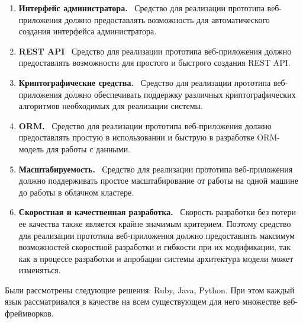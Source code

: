 \begin{enumerate}
  \item \textbf{Интерфейс администратора.}\hfill ~\linebreak
        Средство для реализации прототипа веб-приложения должно предоставлять возможность для автоматического создания интерфейса администратора.

  \item \textbf{REST API}\hfill ~\linebreak
        Средство для реализации прототипа веб-приложения должно предоставлять возможности для простого и быстрого создания REST API.

  \item \textbf{Криптографические средства.}\hfill ~\linebreak
        Средство для реализации прототипа веб-приложения должно обеспечивать поддержку различных криптографических алгоритмов необходимых для реализации системы.

  \item \textbf{ORM.}\hfill ~\linebreak
        Средство для реализации прототипа веб-приложения должно предоставлять простую в использовании и быструю в разработке ORM-модель для работы с данными.

  \item \textbf{Масштабируемость.}\hfill ~\linebreak
        Средство для реализации прототипа веб-приложения должно поддерживать простое масштабирование от работы на одной машине до работы в облачном кластере.

  \item \textbf{Скоростная и качественная разработка.}\hfill ~\linebreak
        Скорость разработки без потери ее качества также является крайне значимым критерием. Поэтому средство для реализации прототипа веб-приложения должно предоставлять максимум возможностей скоростной разработки и гибкости при их модификации, так как в процессе разработки и апробации системы архитектура модели может изменяться.

\end{enumerate} 

Были рассмотрены следующие решения: Ruby, Java, Python. При этом каждый язык рассматривался в качестве на всем существующем для него множестве веб-фреймворков.

\pagebreak 

